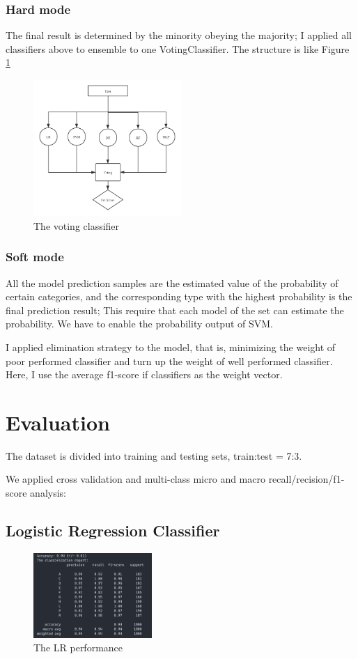 \documentclass[11pt,en]{elegantpaper}
\begin{document}
\subsubsection{Hard mode}
The final result is determined by the minority obeying the majority; I applied all classifiers above to ensemble to one VotingClassifier. The structure is like Figure \ref{vcl}
\begin{figure}[h]
	\centering
	\includegraphics[width=0.5\textwidth]{image/voting}
	\caption{The voting classifier}
	\label{vcl}
\end{figure}


\subsubsection{Soft mode}
All the model prediction samples are the estimated value of the probability of certain categories, and the corresponding type with the highest probability is the final prediction result; This require that each model of the set can estimate the probability. We have to enable the probability output of SVM.

I applied elimination strategy to the model, that is, minimizing the weight of poor performed classifier and turn up the weight of well performed classifier. Here, I use the average f1-score if classifiers as the weight vector.

\section{Evaluation}
The dataset is divided into training and testing sets, train:test = 7:3.

We applied cross validation and multi-class micro and macro recall/recision/f1-score analysis:

\subsection*{Logistic Regression Classifier}
\begin{figure}[H]
	\centering
	\includegraphics[width=0.4\textwidth]{image/lrpf}
	\caption{The LR performance}
	\label{lrpf}
\end{figure}
\end{document}
